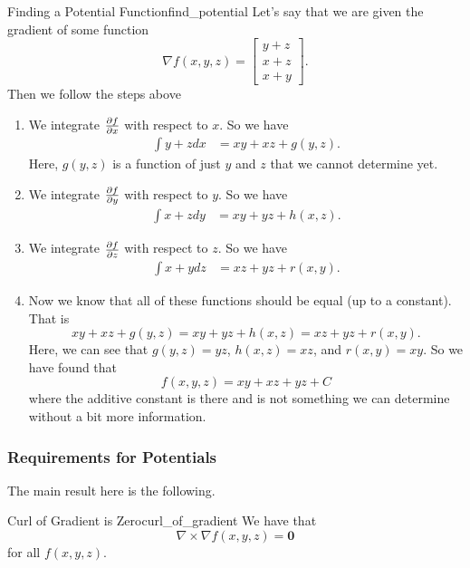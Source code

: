         \begin{ex}{Finding a Potential Function}{find_potential}
        Let's say that we are given the gradient of some function
        \[
        \nabla f(x,y,z) = \begin{bmatrix} y+z \\ x+z \\ x+y \end{bmatrix}.
        \]
        Then we follow the steps above
        \begin{enumerate}[1.]
            \item We integrate $\frac{\partial f}{\partial x}$ with respect to $x$.  So we have
            \begin{align*}
                \int y+z dx &= xy+xz + g(y,z).
            \end{align*}
            Here, $g(y,z)$ is a function of just $y$ and $z$ that we cannot determine yet.
            \item We integrate $\frac{\partial f}{\partial y}$ with respect to $y$. So we have
            \begin{align*}
                \int x+z dy &= xy+yz + h(x,z).
            \end{align*}
            \item We integrate $\frac{\partial f}{\partial z}$ with respect to $z$. So we have
            \begin{align*}
                \int x+y dz &= xz+yz + r(x,y).
            \end{align*}
            \item Now we know that all of these functions should be equal (up to a constant).  That is
            \[
            xy+xz+g(y,z)=xy+yz+h(x,z)=xz+yz+r(x,y).
            \]
            Here, we can see that $g(y,z)=yz$, $h(x,z)=xz$, and $r(x,y)=xy$.  So we have found that 
            \[
            f(x,y,z) = xy + xz + yz + C
            \]
            where the additive constant is there and is not something we can determine without a bit more information.
        \end{enumerate}
        \end{ex}
        
        \subsubsection{Requirements for Potentials}
        
        The main result here is the following.
        
        \begin{prop}{Curl of Gradient is Zero}{curl_of_gradient}
        We have that
        \[
        \nabla \times \nabla f(x,y,z) = \mathbf{0}
        \]
        for all $f(x,y,z)$.
        \end{prop}
        
